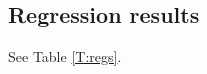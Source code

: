 \documentclass[letter,12pt]{article}
\begin{document}
\begin{multicols}{2}












\end{multicols}

\subsection{Regression results}

See Table \ref{T:regs}.
\end{document}
